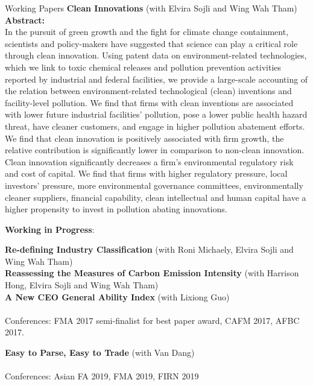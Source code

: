 \documentclass{resume} %
\begin{document}
\begin{rSection}{Working Papers}
	{\bf Clean Innovations} (with Elvira Sojli and Wing Wah Tham)\\
	{\bf Abstract:}\\
	In the pursuit of green growth and the fight for climate change containment, scientists and policy-makers have suggested that science can play a critical role through clean innovation. Using patent data on environment-related technologies, which we link to toxic chemical releases and pollution prevention activities reported by industrial and federal facilities, we provide a large-scale accounting of the relation between environment-related technological (clean) inventions and facility-level pollution. We find that firms with clean inventions are associated with lower future industrial facilities' pollution, pose a lower public health hazard threat, have cleaner customers, and engage in higher pollution abatement efforts. We find that clean innovation is positively associated with firm growth, the relative contribution is significantly lower in comparison to non-clean innovation. Clean innovation significantly decreases a firm's environmental regulatory risk and cost of capital. We find that firms with higher regulatory pressure, local investors' pressure, more environmental governance committees, environmentally cleaner suppliers, financial capability, clean intellectual and human capital have a higher propensity to invest in pollution abating innovations.

  \textbf{Working in Progress}:

	{\bf Re-defining Industry Classification} (with Roni Michaely, Elvira Sojli and Wing Wah Tham)\\

	{\bf Reassessing the Measures of Carbon Emission Intensity} (with Harrison Hong, Elvira Sojli and Wing Wah Tham)\\

	{\bf A New CEO General Ability Index} (with Lixiong Guo) \\
	\\ Conferences: FMA 2017 semi-finalist for best paper award, CAFM 2017, AFBC 2017.

		{\bf Easy to Parse, Easy to Trade} (with Van Dang)\\
	\\ Conferences: Asian FA 2019, FMA 2019, FIRN 2019



\end{rSection}
\end{document}
